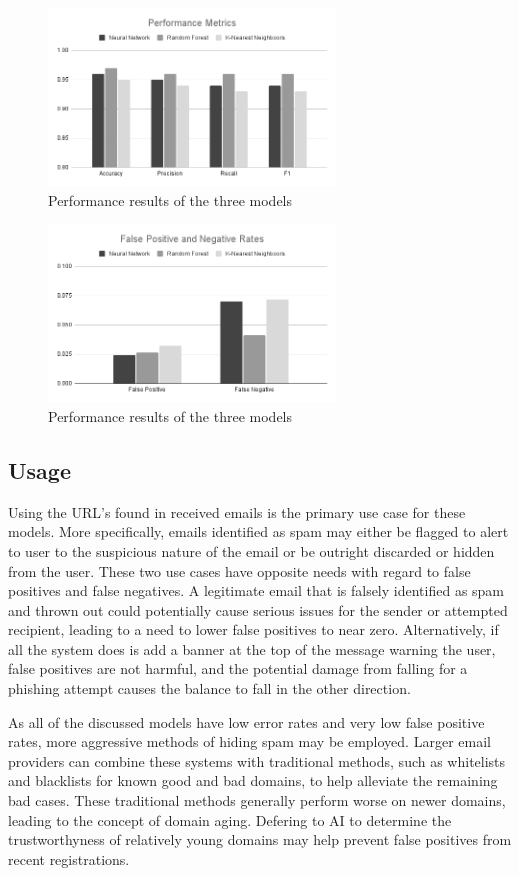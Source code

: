   \begin{figure}[!ht]
	\centering
	\includegraphics[width=3in]{Performance Metrics.png}
	
	\caption{\label{fig:perf_metrics} Performance results of the three models}
	
\end{figure}  
\begin{figure}[!ht]
\centering
\includegraphics[width=3in]{False Positive and Negative Rates.png}

\caption{\label{fig:rate_metrics} Performance results of the three models}

\end{figure}

\subsection{Usage}

Using the URL's found in received emails is the primary use case for these models. More specifically, emails identified as spam may either be flagged to alert to user to the suspicious nature of the email or be outright discarded or hidden from the user. These two use cases have opposite needs with regard to false positives and false negatives. A legitimate email that is falsely identified as spam and thrown out could potentially cause serious issues for the sender or attempted recipient, leading to a need to lower false positives to near zero. Alternatively, if all the system does is add a banner at the top of the message warning the user, false positives are not harmful, and the potential damage from falling for a phishing attempt causes the balance to fall in the other direction.

As all of the discussed models have low error rates and very low false positive rates, more aggressive methods of hiding spam may be employed. Larger email providers can combine these systems with traditional methods, such as whitelists and blacklists for known good and bad domains, to help alleviate the remaining bad cases. These traditional methods generally perform worse on newer domains, leading to the concept of domain aging. Defering to AI to determine the trustworthyness of relatively young domains may help prevent false positives from recent registrations.


  